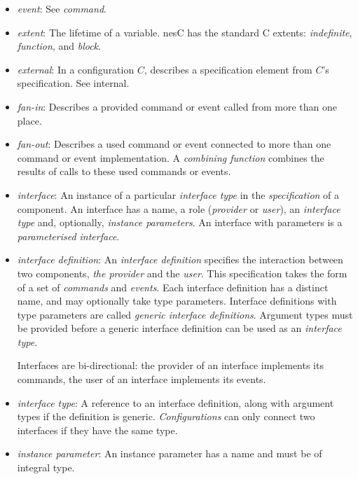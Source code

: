 \documentclass[11pt,letterpaper]{article}
\newcommand{\nesc}{nesC\xspace}
\begin{document}
\begin{itemize}
\item \emph{event}: See \emph{command}.

\item \emph{extent}: The lifetime of a variable. \nesc has the standard C
extents: \emph{indefinite}, \emph{function}, and \emph{block}.

\item \emph{external}: In a configuration $C$, describes a specification
element from $C$'s specification. See internal.

\item \emph{fan-in}: Describes a provided command or event called from more
than one place.

\item \emph{fan-out}: Describes a used command or event connected to more
than one command or event implementation. A \emph{combining function}
combines the results of calls to these used commands or events.

\item \emph{interface}: An instance of a particular \emph{interface type}
in the \emph{specification} of a component. An interface has a name, a role
(\emph{provider} or \emph{user}), an \emph{interface type} and, optionally,
\emph{instance parameters}. An interface with parameters is a
\emph{parameterised interface}.

\item \emph{interface definition}: An \emph{interface definition} specifies
the interaction between two components, \emph{the provider} and the
\emph{user}. This specification takes the form of a set of \emph{commands}
and \emph{events}. Each interface definition has a distinct name, and may
optionally take type parameters. Interface definitions with type parameters
are called \emph{generic interface definitions}. Argument types must be
provided before a generic interface definition can be used as an 
\emph{interface type}.

Interfaces are bi-directional: the provider of an interface implements its
commands, the user of an interface implements its events.

\item \emph{interface type}: A reference to an interface definition,
along with argument types if the definition is generic. \emph{Configurations}
can only connect two interfaces if they have the same type.

\item \emph{instance parameter}: An instance parameter has a name and must
be of integral type.


\end{itemize}
\end{document}
